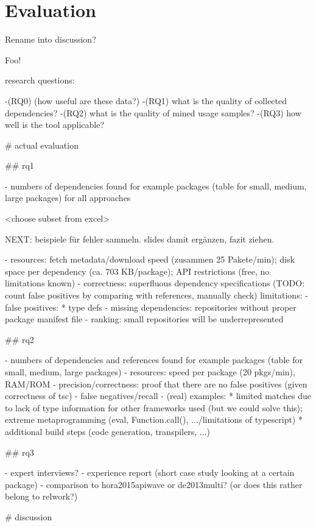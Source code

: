 \section{Evaluation}
\label{sec:evaluation}

Rename into discussion?

Foo!

research questions:

-(RQ0) (how useful are these data?)
-(RQ1) what is the quality of collected dependencies?
-(RQ2) what is the quality of mined usage samples?
-(RQ3) how well is the tool applicable?

\# actual evaluation

\#\# rq1

- numbers of dependencies found for example packages (table for small, medium, large packages) for all approaches

<choose subset from excel>

NEXT: beispiele für fehler sammeln. slides damit ergänzen, fazit ziehen.

- resources: fetch metadata/download speed (zusammen 25 Pakete/min); disk space per dependency (ca. 703 KB/package); API restrictions (free, no limitations known)
- correctness: superfluous dependency specifications (TODO: count false positives by comparing with references, manually check)
limitations:
- false positives:
	* type defs
- missing dependencies: repositories without proper package manifest file
- ranking: small repositories will be underrepresented

\#\# rq2

- numbers of dependencies and references found for example packages (table for small, medium, large packages)
- resources: speed per package (20 pkgs/min), RAM/ROM
- precision/correctness: proof that there are no false positives (given correctness of tsc)
- false negatives/recall - (real) examples:
	* limited matches due to lack of type information for other frameworks used (but we could solve this); extreme metaprogramming (eval, Function.call(), .../limitations of typescript)
	* additional build steps (code generation, transpilers, ...)

\#\# rq3

- expert interviews?
- experience report (short case study looking at a certain package)
- comparison to hora2015apiwave or de2013multi? (or does this rather belong to relwork?)

\# discussion
